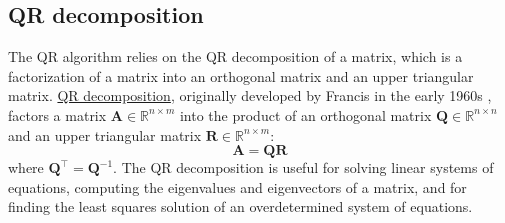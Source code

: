 \documentclass{article}[11pt]
\begin{document}
\subsection{QR decomposition}
The QR algorithm relies on the QR decomposition of a matrix, which is a factorization of a matrix into an orthogonal matrix and an upper triangular matrix.
\href{https://en.wikipedia.org/wiki/QR_decomposition}{QR decomposition}, originally developed by Francis in the early 1960s \cite{Francis-QR-1961, Francis-QR-1962}, factors a matrix $\mathbf{A}\in\mathbb{R}^{n\times{m}}$ 
into the product of an orthogonal matrix $\mathbf{Q}\in\mathbb{R}^{n\times{n}}$ and 
an upper triangular matrix $\mathbf{R}\in\mathbb{R}^{n\times{m}}$:
\begin{equation}
\mathbf{A} = \mathbf{Q}\mathbf{R}
\end{equation}
where $\mathbf{Q}^{\top} = \mathbf{Q}^{-1}$. 
The QR decomposition is useful for solving linear systems of equations, computing the eigenvalues and eigenvectors of a matrix, and for finding the least squares solution of an overdetermined system of equations.
\end{document}
